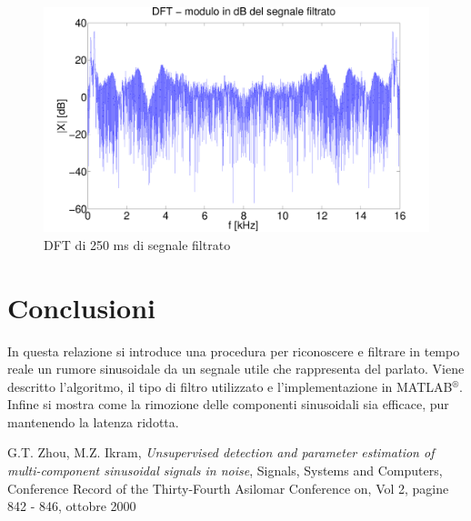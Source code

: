 \documentclass[10pt,A4]{article}
\begin{document}
\begin{figure}[h]
  \centering
  \includegraphics[width = 1\textwidth, keepaspectratio]{images/DFTdBFiltered.pdf}
  \caption{DFT di 250 ms di segnale filtrato}
  \label{fig:filt}
\end{figure}

\section{Conclusioni}
In questa relazione si introduce una procedura per riconoscere e filtrare in tempo reale un rumore sinusoidale da un segnale utile che rappresenta del parlato. Viene descritto l'algoritmo, il tipo di filtro utilizzato e l'implementazione in MATLAB$^{\circledR}$. Infine si mostra come la rimozione delle componenti sinusoidali sia efficace, pur mantenendo la latenza ridotta. \\

\begin{thebibliography}[1]

    G.T. Zhou, M.Z. Ikram, \emph{Unsupervised detection and parameter estimation of multi-component sinusoidal signals in noise}, Signals, Systems and Computers, Conference Record of the Thirty-Fourth Asilomar Conference on, Vol 2, pagine 842 - 846, ottobre 2000

\end{thebibliography}
\end{document}
